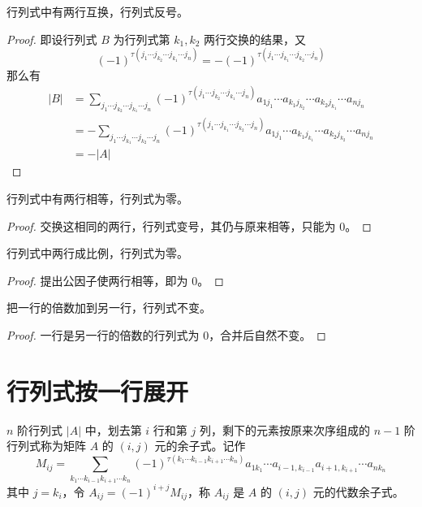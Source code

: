 \begin{theorem}
	行列式中有两行互换，行列式反号。
\end{theorem}

\begin{proof}
	即设行列式 $B$ 为行列式第 $k_1,k_2$ 两行交换的结果，又
	\[(-1)^{\tau(j_1\cdots j_{k_2} \cdots j_{k_1} \cdots j_n)} =- (-1)^{\tau(j_1\cdots j_{k_1} \cdots j_{k_2} \cdots j_n)}\]
	那么有
	\begin{equation*}
		\begin{aligned}
			|B| &= \sum_{j_1\cdots j_{k_2} \cdots j_{k_1} \cdots j_n}(-1)^{\tau(j_1\cdots j_{k_2} \cdots j_{k_1} \cdots j_n)}
			a_{1j_1}\cdots a_{k_1j_{k_2}}\cdots a_{k_2j_{k_1}}\cdots a_{nj_n}\\
			&=-\sum_{j_1\cdots j_{k_1} \cdots j_{k_2} \cdots j_n}(-1)^{\tau(j_1\cdots j_{k_1} \cdots j_{k_2} \cdots j_n)}
			a_{1j_1}\cdots a_{k_1j_{k_1}}\cdots a_{k_2j_{k_2}}\cdots a_{nj_n}\\
			&=-|A|
		\end{aligned}
	\end{equation*}
\end{proof}

\begin{theorem}
	行列式中有两行相等，行列式为零。
\end{theorem}

\begin{proof}
	交换这相同的两行，行列式变号，其仍与原来相等，只能为 $0$。
\end{proof}

\begin{theorem}
	行列式中两行成比例，行列式为零。
\end{theorem}

\begin{proof}
	提出公因子使两行相等，即为 $0$。
\end{proof}

\begin{theorem}
	把一行的倍数加到另一行，行列式不变。
\end{theorem}

\begin{proof}
	一行是另一行的倍数的行列式为 $0$，合并后自然不变。
\end{proof}

\section{行列式按一行展开}

\begin{definition}[代数余子式]
	$n$ 阶行列式 $|A|$ 中，划去第 $i$ 行和第 $j$ 列，剩下的元素按原来次序组成的 $n-1$ 阶行列式称为矩阵 $A$ 的 $(i,j)$ 元的余子式。记作 
	\[M_{ij} = \sum_{k_1\cdots k_{i-1}k_{i+1}\cdots k_n}(-1)^{\tau(k_1\cdots k_{i-1}k_{i+1}\cdots k_n)}a_{1k_1}\cdots a_{i-1,k_{i-1}}a_{i+1,k_{i+1}}\cdots a_{nk_n}\]
	其中 $j=k_i$，令 $A_{ij}=(-1)^{i+j}M_{ij}$，称 $A_{ij}$ 是 $A$ 的 $(i,j)$ 元的代数余子式。
\end{definition}


